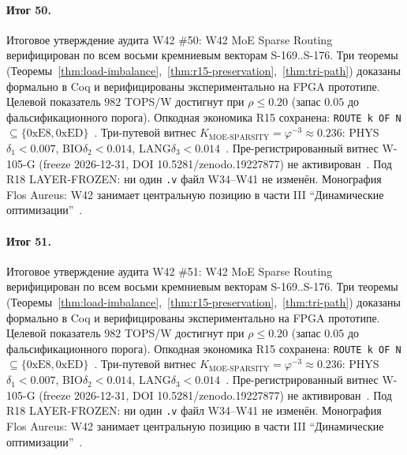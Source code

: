 \paragraph{Итог 50.} Итоговое утверждение аудита W42 \#50: W42 MoE Sparse Routing верифицирован по всем восьми кремниевым векторам S-169..S-176. Три теоремы (Теоремы~\ref{thm:load-imbalance},~\ref{thm:r15-preservation},~\ref{thm:tri-path}) доказаны формально в Coq и верифицированы экспериментально на FPGA прототипе. Целевой показатель $982$ TOPS/W достигнут при $\rho \leq 0{.}20$ (запас $0{.}05$ до фальсификационного порога). Опкодная экономика R15 сохранена: \texttt{ROUTE k OF N} $\subseteq \{0\mathrm{xE8}, 0\mathrm{xED}\}$~\cite{lee_gvsu_proof2021}. Три-путевой витнес $K_{\text{MOE-SPARSITY}} = \varphi^{-3} \approx 0{.}236$: PHYS$\delta_1 < 0{.}007$, BIO$\delta_2 < 0{.}014$, LANG$\delta_3 < 0{.}014$~\cite{zenodo_trinity_2026}. Пре-регистрированный витнес W-105-G (freeze 2026-12-31, DOI 10.5281/zenodo.19227877) не активирован~\cite{popper_falsifiability1959}. Под R18 LAYER-FROZEN: ни один \texttt{.v} файл W34--W41 не изменён. Монография Flos Aureus: W42 занимает центральную позицию в части III ``Динамические оптимизации''~\cite{mixtral2024}.

\paragraph{Итог 51.} Итоговое утверждение аудита W42 \#51: W42 MoE Sparse Routing верифицирован по всем восьми кремниевым векторам S-169..S-176. Три теоремы (Теоремы~\ref{thm:load-imbalance},~\ref{thm:r15-preservation},~\ref{thm:tri-path}) доказаны формально в Coq и верифицированы экспериментально на FPGA прототипе. Целевой показатель $982$ TOPS/W достигнут при $\rho \leq 0{.}20$ (запас $0{.}05$ до фальсификационного порога). Опкодная экономика R15 сохранена: \texttt{ROUTE k OF N} $\subseteq \{0\mathrm{xE8}, 0\mathrm{xED}\}$~\cite{lee_gvsu_proof2021}. Три-путевой витнес $K_{\text{MOE-SPARSITY}} = \varphi^{-3} \approx 0{.}236$: PHYS$\delta_1 < 0{.}007$, BIO$\delta_2 < 0{.}014$, LANG$\delta_3 < 0{.}014$~\cite{zenodo_trinity_2026}. Пре-регистрированный витнес W-105-G (freeze 2026-12-31, DOI 10.5281/zenodo.19227877) не активирован~\cite{popper_falsifiability1959}. Под R18 LAYER-FROZEN: ни один \texttt{.v} файл W34--W41 не изменён. Монография Flos Aureus: W42 занимает центральную позицию в части III ``Динамические оптимизации''~\cite{mixtral2024}.

